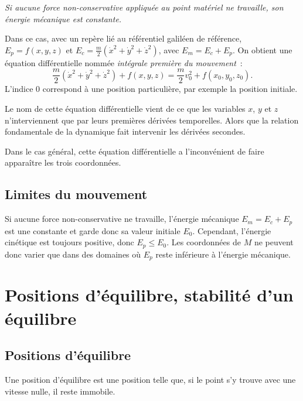 \emph{Si aucune force non-conservative appliquée au point matériel ne travaille, son énergie mécanique est constante.}

Dans ce cas, avec un repère lié au référentiel galiléen de référence, \(E_p=f(x,y,z)\) et \(E_c = \frac{m}{2}(\dot{x}^2+\dot{y}^2+\dot{z}^2)\), avec \(E_m=E_c+E_p\). On obtient une équation différentielle nommée \emph{intégrale première du mouvement}~:
\begin{equation}
  \frac{m}{2}(\dot{x}^2+\dot{y}^2+\dot{z}^2) + f(x,y,z) = \frac{m}{2}v_0^2+f(x_0,y_0,z_0).
\end{equation}
L'indice \(0\) correspond à une position particulière, par exemple la position initiale.

Le nom de cette équation différentielle vient de ce que les variables \(x\), \(y\) et \(z\) n'interviennent que par leurs premières dérivées temporelles. Alors que la relation fondamentale de la dynamique fait intervenir les dérivées secondes.

Dans le cas général, cette équation différentielle a l'inconvénient de faire apparaître les trois coordonnées.

\subsection{Limites du mouvement}
\label{chap4-subsec:limitesdumvt}

Si aucune force non-conservative ne travaille, l'énergie mécanique \(E_m=E_c+E_p\) est une constante et garde donc sa valeur initiale \(E_0\). Cependant, l'énergie cinétique est toujours positive, donc \(E_p \leq E_0\). Les coordonnées de \(M\) ne peuvent donc varier que dans des domaines où \(E_p\) reste inférieure à l'énergie mécanique.

\section{Positions d'équilibre, stabilité d'un équilibre}
\label{chap4-sec:positiondequilibre}

\subsection{Positions d'équilibre}
\label{chap4-subsec:positionsdequilibre}

\begin{defdef}
Une position d'équilibre est une position telle que, si le point s'y trouve avec une vitesse nulle, il reste immobile.
\end{defdef}

